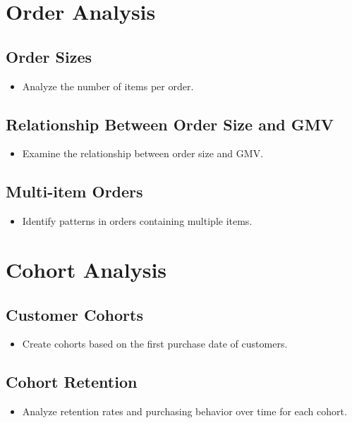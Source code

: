 \documentclass{article}
\begin{document}
\section{Order Analysis}
    \subsection{Order Sizes}
    \begin{itemize}
        \item Analyze the number of items per order.
    \end{itemize}
    
    \subsection{Relationship Between Order Size and GMV}
    \begin{itemize}
        \item Examine the relationship between order size and GMV.
    \end{itemize}
    
    \subsection{Multi-item Orders}
    \begin{itemize}
        \item Identify patterns in orders containing multiple items.
    \end{itemize}

\section{Cohort Analysis}
    \subsection{Customer Cohorts}
    \begin{itemize}
        \item Create cohorts based on the first purchase date of customers.
    \end{itemize}
    
    \subsection{Cohort Retention}
    \begin{itemize}
        \item Analyze retention rates and purchasing behavior over time for each cohort.
    \end{itemize}
\end{document}
